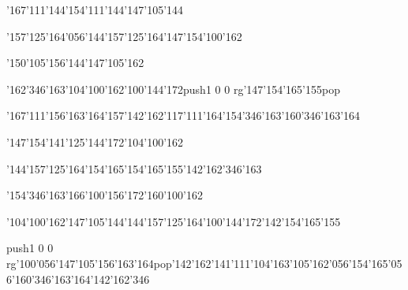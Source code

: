 \null\vfill\ipa\centerline{\enskip\enskip\enskip\enskip\enskip\enskip\enskip\enskip\enskip\enskip\enskip\char'167\char'111\char'144\enskip\enskip\enskip\enskip\enskip\enskip\char'154\char'111\char'144\enskip\char'147\char'105\char'144}\medskip\centerline{\enskip\char'157\char'125\char'164\char'056\char'144\char'157\char'125\char'164\enskip\enskip\enskip\enskip\enskip\enskip\enskip\enskip\enskip\enskip\enskip\char'147\char'154\char'100\char'162}\medskip\centerline{\enskip\enskip\enskip\enskip\enskip\enskip\enskip\enskip\char'150\char'105\char'156\char'144\enskip\enskip\enskip\char'147\char'105\char'162}\medskip\centerline{\enskip\enskip\enskip\enskip\char'162\char'346\char'163\enskip\char'104\char'100\char'162\enskip\enskip\enskip\enskip\enskip\enskip\char'100\char'144\char'172\enskip\pdfcolorstack\match push{1 0 0 rg}\char'147\char'154\char'165\char'155\pdfcolorstack\match pop{}}\medskip\centerline{\enskip\enskip\char'167\char'111\char'156\char'163\char'164\enskip\char'157\enskip\char'142\char'162\char'117\char'111\char'164\enskip\char'154\char'346\char'163\enskip\enskip\enskip\char'160\char'346\char'163\char'164\enskip\enskip\enskip\enskip}\medskip\vfill\footline{\hfil\tt\folio\hfil}\eject
\null\vfill\ipa\centerline{\enskip\char'147\char'154\char'141\char'125\char'144\char'172\enskip\enskip\enskip\enskip\char'104\char'100\char'162\enskip\enskip\enskip\enskip\enskip\enskip\enskip\enskip\enskip\enskip\enskip\enskip\enskip}\medskip\centerline{\enskip\enskip\enskip\enskip\char'144\char'157\char'125\char'164\enskip\char'154\char'165\enskip\char'154\char'165\char'155\enskip\enskip\enskip\enskip\enskip\char'142\char'162\char'346\char'163}\medskip\centerline{\enskip\char'154\char'346\char'163\enskip\enskip\enskip\enskip\char'166\char'100\char'156\char'172\enskip\enskip\enskip\char'160\char'100\char'162}\medskip\centerline{\enskip\enskip\enskip\enskip\char'104\char'100\char'162\enskip\char'147\char'105\char'144\enskip\char'144\char'157\char'125\char'164\enskip\char'100\char'144\char'172\enskip\char'142\char'154\char'165\char'155}\medskip\centerline{\enskip\pdfcolorstack\match push{1 0 0 rg}\char'100\char'056\char'147\char'105\char'156\char'163\char'164\pdfcolorstack\match pop{}\enskip\enskip\enskip\char'142\char'162\char'141\char'111\char'104\enskip\char'163\char'105\char'162\char'056\char'154\char'165\char'056\char'160\char'346\char'163\char'164\enskip\char'142\char'162\char'346}\medskip\vfill\footline{\hfil\tt\folio\hfil}\eject
